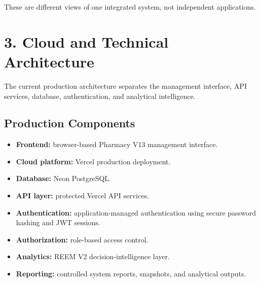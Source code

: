 \documentclass[12pt,a4paper]{article}
\begin{document}
These are different views of one integrated system, not independent applications.

\section*{3. Cloud and Technical Architecture}

The current production architecture separates the management interface, API services, database, authentication, and analytical intelligence.

\begin{center}
\end{center}

\subsection*{Production Components}

\begin{itemize}[leftmargin=1cm]
\item \textbf{Frontend:} browser-based Pharmacy V13 management interface.
\item \textbf{Cloud platform:} Vercel production deployment.
\item \textbf{Database:} Neon PostgreSQL.
\item \textbf{API layer:} protected Vercel API services.
\item \textbf{Authentication:} application-managed authentication using secure password hashing and JWT sessions.
\item \textbf{Authorization:} role-based access control.
\item \textbf{Analytics:} REEM V2 decision-intelligence layer.
\item \textbf{Reporting:} controlled system reports, snapshots, and analytical outputs.
\end{itemize}
\end{document}
